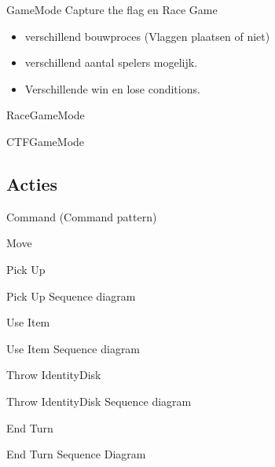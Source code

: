 \documentclass[11pt,t]{beamer}
\begin{document}
\begin{frame}{GameMode}
Capture the flag en Race Game
\begin{itemize}
\item verschillend bouwproces (Vlaggen plaatsen of niet)
\item verschillend aantal spelers mogelijk.
\item Verschillende win en lose conditions.
\end{itemize}

\end{frame}
\begin{frame}{RaceGameMode}
\end{frame}

\begin{frame}{CTFGameMode}
\end{frame}

\subsection{Acties}

\begin{frame}{Command (Command pattern)}
\end{frame}

\begin{frame}{Move}
\end{frame}

\begin{frame}{Pick Up}
\end{frame}

\begin{frame}{Pick Up Sequence diagram}
\end{frame}

\begin{frame}{Use Item}
\end{frame}

\begin{frame}{Use Item Sequence diagram}
\end{frame}

\begin{frame}{Throw IdentityDisk}
\end{frame}

\begin{frame}{Throw IdentityDisk Sequence diagram}
\end{frame}

\begin{frame}{End Turn}
\end{frame}

\begin{frame}{End Turn Sequence Diagram}

\end{frame}
\end{document}
